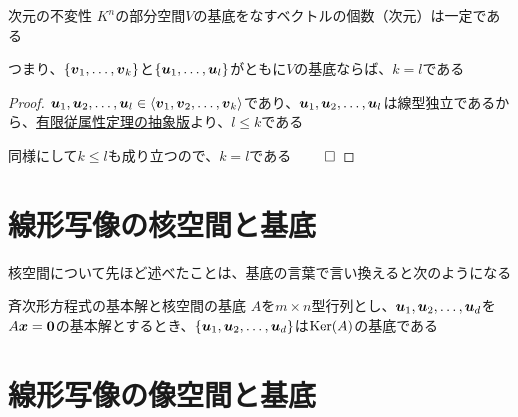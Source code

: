 \documentclass[../../../topic_linear-algebra]{subfiles}
\begin{document}
\begin{theorem}{次元の不変性}
  $K^n$の部分空間$V$の基底をなすベクトルの個数（次元）は一定である

  つまり、$\{ \vb*{v}_1, \dots, \vb*{v}_k \}$と$\{ \vb*{u}_1, \dots, \vb*{u}_l \}$がともに$V$の基底ならば、$k = l$である
\end{theorem}

\begin{proof}
  $\vb*{u}_1, \vb*{u}_2, \dots, \vb*{u}_l \in \langle \vb*{v}_1, \vb*{v}_2, \dots, \vb*{v}_k \rangle$であり、$\vb*{u}_1, \vb*{u}_2, \dots, \vb*{u}_l$は線型独立であるから、\hyperref[thm:abstract-finite-dependency]{有限従属性定理の抽象版}より、$l \leq k$である

  同様にして$k \leq l$も成り立つので、$k = l$である $\qed$
\end{proof}

\sectionline
\section{線形写像の核空間と基底}

核空間について先ほど述べたことは、基底の言葉で言い換えると次のようになる

\begin{theorem}{斉次形方程式の基本解と核空間の基底}
  $A$を$m \times n$型行列とし、$\vb*{u}_1, \vb*{u}_2, \dots, \vb*{u}_d$を$A\vb*{x} = \vb*{0}$の基本解とするとき、$\{ \vb*{u}_1, \vb*{u}_2, \dots, \vb*{u}_d \}$は$\operatorname{Ker}(A)$の基底である
\end{theorem}

\sectionline
\section{線形写像の像空間と基底}

\end{document}
